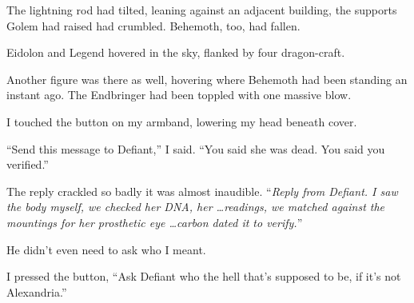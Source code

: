 The lightning rod had tilted, leaning against an adjacent building, the supports Golem had raised had crumbled.  Behemoth, too, had fallen.



Eidolon and Legend hovered in the sky, flanked by four dragon-craft.



Another figure was there as well, hovering where Behemoth had been standing an instant ago.  The Endbringer had been toppled with one massive blow.



I touched the button on my armband, lowering my head beneath cover.



``Send this message to Defiant,'' I said.  ``You said she was dead.  You said you verified.''



The reply crackled so badly it was almost inaudible.  ``\emph{Reply from Defiant.  I saw the body myself, we checked her DNA, her \ldots readings, we matched against the mountings for her prosthetic eye \ldots carbon dated it to verify.}''



He didn't even need to ask who I meant.



I pressed the button, ``Ask Defiant who the hell that's supposed to be, if it's not Alexandria.''






